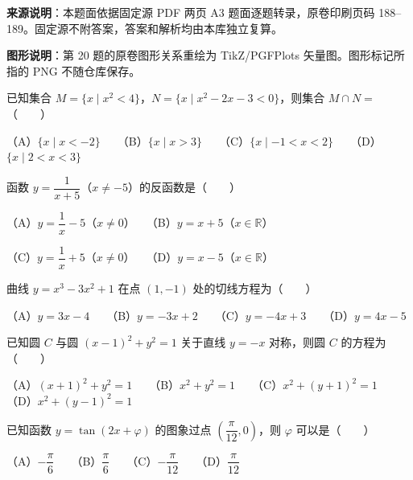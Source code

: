 


\begin{gktip}
\textbf{来源说明}：本题面依据固定源 PDF 两页 A3 题面逐题转录，原卷印刷页码 188–189。固定源不附答案，答案和解析均由本库独立复算。

\textbf{图形说明}：第 20 题的原卷图形关系重绘为 TikZ/PGFPlots 矢量图。图形标记所指的 PNG 不随仓库保存。
\end{gktip}


\begin{question}
已知集合 $M=\{x\mid x^2<4\}$，$N=\{x\mid x^2-2x-3<0\}$，则集合 $M\cap N=$\mbox{（　　）}

（A）$\{x\mid x<-2\}$　　（B）$\{x\mid x>3\}$　　（C）$\{x\mid-1<x<2\}$　　（D）$\{x\mid2<x<3\}$

\end{question}
\begin{question}
函数 $y=\dfrac1{x+5}$（$x\ne-5$）的反函数是\mbox{（　　）}

（A）$y=\dfrac1x-5$（$x\ne0$）　　（B）$y=x+5$（$x\in\mathbb R$）

（C）$y=\dfrac1x+5$（$x\ne0$）　　（D）$y=x-5$（$x\in\mathbb R$）

\end{question}
\begin{question}
曲线 $y=x^3-3x^2+1$ 在点 $(1,-1)$ 处的切线方程为\mbox{（　　）}

（A）$y=3x-4$　　（B）$y=-3x+2$　　（C）$y=-4x+3$　　（D）$y=4x-5$

\end{question}
\begin{question}
已知圆 $C$ 与圆 $(x-1)^2+y^2=1$ 关于直线 $y=-x$ 对称，则圆 $C$ 的方程为\mbox{（　　）}

（A）$(x+1)^2+y^2=1$　　（B）$x^2+y^2=1$　　（C）$x^2+(y+1)^2=1$　　（D）$x^2+(y-1)^2=1$

\end{question}
\begin{question}
已知函数 $y=\tan(2x+\varphi)$ 的图象过点 $\left(\dfrac\pi{12},0\right)$，则 $\varphi$ 可以是\mbox{（　　）}

（A）$-\dfrac\pi6$　　（B）$\dfrac\pi6$　　（C）$-\dfrac\pi{12}$　　（D）$\dfrac\pi{12}$

\end{question}
